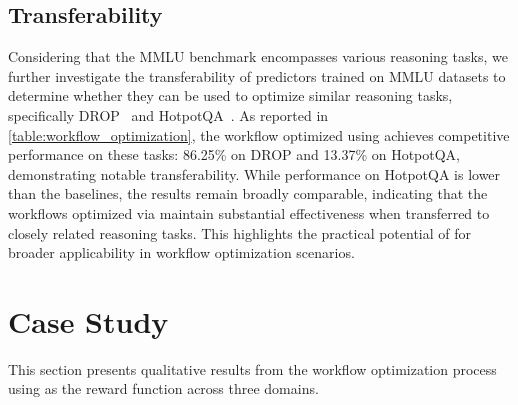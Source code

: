 


\subsection{Transferability}
Considering that the MMLU benchmark encompasses various reasoning tasks, we further investigate the transferability of predictors trained on MMLU datasets to determine whether they can be used to optimize similar reasoning tasks, specifically DROP~\citep{DROP} and HotpotQA~\citep{HotpotQA}. As reported in \autoref{table:workflow_optimization}, the workflow optimized using \ours{} achieves competitive performance on these tasks: 86.25\% on DROP and 13.37\% on HotpotQA, demonstrating notable transferability. While performance on HotpotQA is lower than the baselines, the results remain broadly comparable, indicating that the workflows optimized via \ours{} maintain substantial effectiveness when transferred to closely related reasoning tasks. This highlights the practical potential of \ours{} for broader applicability in workflow optimization scenarios.

\section{Case Study} \label{section:case_study}
This section presents qualitative results from the workflow optimization process using \ours{} as the reward function across three domains.

